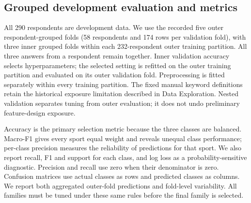 \subsection{Grouped development evaluation and metrics}
All 290 respondents are development data. We use the recorded five outer
respondent-grouped folds (58 respondents and 174 rows per validation fold),
with three inner grouped folds within each 232-respondent outer training
partition. All three answers from a respondent remain together. Inner
validation accuracy selects hyperparameters; the selected setting is refitted
on the outer training partition and evaluated on its outer validation fold.
Preprocessing is fitted separately within every training partition. The fixed
manual keyword definitions retain the historical exposure limitation described
in Data Exploration. Nested validation separates tuning from outer evaluation;
it does not undo preliminary feature-design exposure.\cite{sklearn_nested_cv}

Accuracy is the primary selection metric because the three classes are balanced.
Macro-F1 gives every sport equal weight and reveals unequal class performance;
per-class precision measures the reliability of predictions for that sport.
We also report recall, F1 and support for each class, and log loss as a
probability-sensitive diagnostic. Precision and recall use zero when their
denominator is zero. Confusion matrices use actual classes as rows and predicted
classes as columns. We report both aggregated outer-fold predictions and
fold-level variability. All families must be tuned under these same rules
before the final family is selected.
